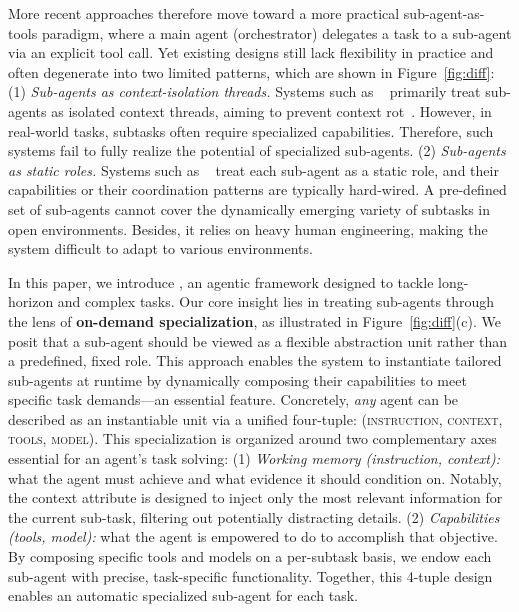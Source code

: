 More recent approaches therefore move toward a more practical sub-agent-as-tools paradigm, where a main agent (orchestrator) delegates a task to a sub-agent via an explicit tool call. 
Yet existing designs still lack flexibility in practice and often degenerate into two limited patterns, which are shown in Figure~\ref{fig:diff}:
(1) \textit{Sub-agents as context-isolation threads.} Systems such as ~\citet{schroeder2025thread, sun2025scaling} primarily treat sub-agents as isolated context threads, aiming to prevent context rot~\citep{hong2025context}. However, in real-world tasks, subtasks often require specialized capabilities. Therefore, such systems fail to fully realize the potential of specialized sub-agents. (2) \textit{Sub-agents as static roles.} 
Systems such as ~\citet{anthropic_claude_code_subagents, li2025chain} treat each sub-agent as a static role, and their capabilities or their coordination patterns are typically hard‑wired. A pre-defined set of sub‑agents cannot cover the dynamically emerging variety of subtasks in open environments. Besides, it relies on heavy human engineering, making the system difficult to adapt to various environments.

In this paper, we introduce \our{}, an agentic framework designed to tackle long-horizon and complex tasks. Our core insight lies in treating sub-agents through the lens of \textbf{on-demand specialization}, as illustrated in Figure~\ref{fig:diff}(c). 
We posit that a sub-agent should be viewed as a flexible abstraction unit rather than a predefined, fixed role. This approach enables the system to instantiate tailored sub-agents at runtime by dynamically composing their capabilities to meet specific task demands—an essential feature.
Concretely, \emph{any} agent can be described as an instantiable unit via a unified four-tuple: \textsc{(instruction, context, tools, model)}. This specialization is organized around two complementary axes essential for an agent's task solving: (1) \emph{Working memory (instruction, context):} what the agent must achieve and what evidence it should condition on. Notably, the context attribute is designed to inject only the most relevant information for the current sub-task, filtering out potentially distracting details. (2) \emph{Capabilities (tools, model):} what the agent is empowered to do to accomplish that objective. By composing specific tools and models on a per-subtask basis, we endow each sub-agent with precise, task-specific functionality. Together, this 4-tuple design enables an automatic specialized sub-agent for each task.


